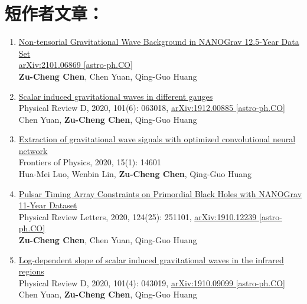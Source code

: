 \section*{短作者文章：}
\begin{enumerate}
    \item \href{https://arxiv.org/abs/2101.06869}{Non-tensorial Gravitational Wave Background in NANOGrav 12.5-Year Data Set}\\ \href{https://arxiv.org/abs/2101.06869}{arXiv:2101.06869 [astro-ph.CO]}\\
    \textbf{Zu-Cheng Chen}, Chen Yuan, Qing-Guo Huang
    
    \item \href{https://journals.aps.org/prd/abstract/10.1103/PhysRevD.101.063018}{Scalar induced gravitational waves in different gauges}\\
    Physical Review D, 2020, 101(6): 063018, \href{https://arxiv.org/abs/1912.00885}{arXiv:1912.00885 [astro-ph.CO]}\\
    Chen Yuan, \textbf{Zu-Cheng Chen}, Qing-Guo Huang
    
    \item \href{https://link.springer.com/article/10.1007\%2Fs11467-019-0936-x}{Extraction of gravitational wave signals with optimized convolutional neural network}\\
    Frontiers of Physics, 2020, 15(1): 14601\\
    Hua-Mei Luo, Wenbin Lin, \textbf{Zu-Cheng Chen}, Qing-Guo Huang    
    
    \item \href{https://journals.aps.org/prl/abstract/10.1103/PhysRevLett.124.251101}{Pulsar Timing Array Constraints on Primordial Black Holes with NANOGrav 11-Year Dataset}\\
    Physical Review Letters, 2020, 124(25): 251101, \href{https://arxiv.org/abs/1910.12239}{arXiv:1910.12239 [astro-ph.CO]}\\    
    \textbf{Zu-Cheng Chen}, Chen Yuan, Qing-Guo Huang    
    
    \item \href{https://journals.aps.org/prd/abstract/10.1103/PhysRevD.101.043019}{Log-dependent slope of scalar induced gravitational waves in the infrared regions}\\
    Physical Review D, 2020, 101(4): 043019, \href{https://arxiv.org/abs/1910.09099}{arXiv:1910.09099 [astro-ph.CO]}\\ 
    Chen Yuan, \textbf{Zu-Cheng Chen}, Qing-Guo Huang
    

\end{enumerate}
